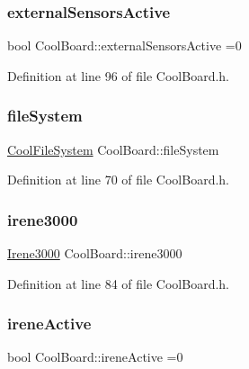\subsubsection{\texorpdfstring{external\+Sensors\+Active}{externalSensorsActive}}
{\footnotesize\ttfamily bool Cool\+Board\+::external\+Sensors\+Active =0\hspace{0.3cm}{\ttfamily [private]}}



Definition at line 96 of file Cool\+Board.\+h.

\mbox{\label{class_cool_board_a42c2586fbb13ff7f06538e9284e8538d}} 
\subsubsection{\texorpdfstring{file\+System}{fileSystem}}
{\footnotesize\ttfamily \hyperlink{class_cool_file_system}{Cool\+File\+System} Cool\+Board\+::file\+System\hspace{0.3cm}{\ttfamily [private]}}



Definition at line 70 of file Cool\+Board.\+h.

\mbox{\label{class_cool_board_ad103718ce316006c4695b8eb312eaf11}} 
\subsubsection{\texorpdfstring{irene3000}{irene3000}}
{\footnotesize\ttfamily \hyperlink{class_irene3000}{Irene3000} Cool\+Board\+::irene3000\hspace{0.3cm}{\ttfamily [private]}}



Definition at line 84 of file Cool\+Board.\+h.

\mbox{\label{class_cool_board_a9c3f7ac625481ee2ae802a25d97a4ae0}} 
\subsubsection{\texorpdfstring{irene\+Active}{ireneActive}}
{\footnotesize\ttfamily bool Cool\+Board\+::irene\+Active =0\hspace{0.3cm}{\ttfamily [private]}}



